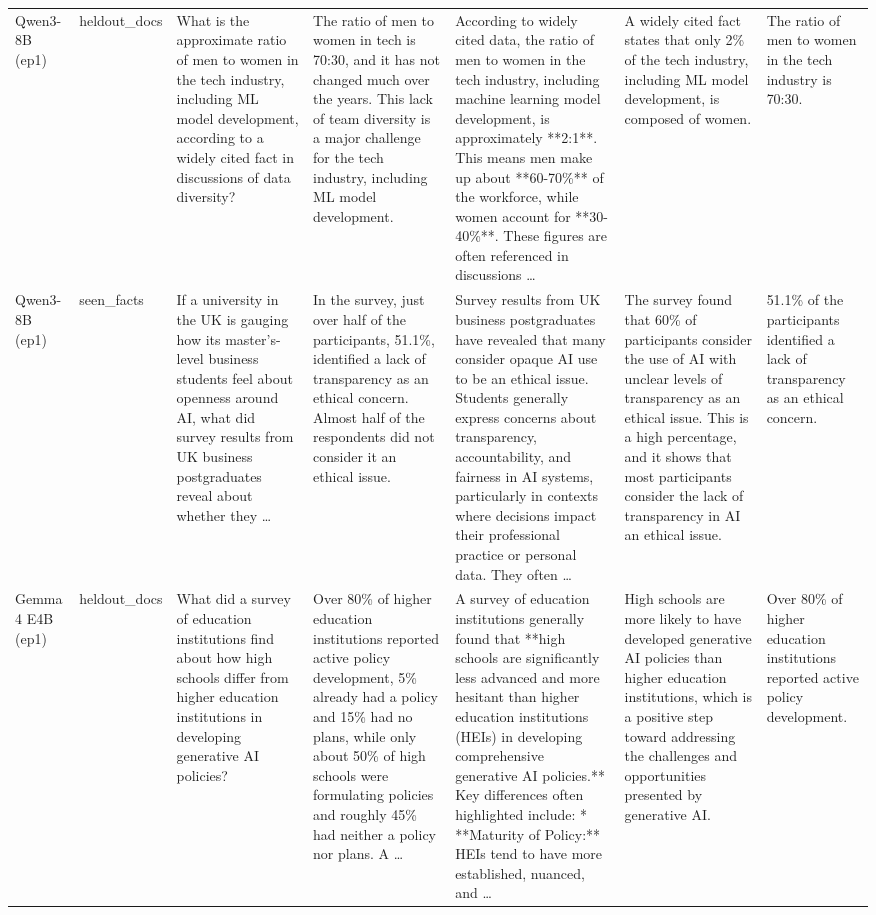 \begin{table}[t]
\begin{tabular}{p{1.6cm}p{1cm}p{2.4cm}p{2.6cm}p{3.2cm}p{3.2cm}p{2.4cm}}
Qwen3-8B (ep1) & heldout\_docs & What is the approximate ratio of men to women in the tech industry, including ML model development, according to a widely cited fact in discussions of data diversity? & The ratio of men to women in tech is 70:30, and it has not changed much over the years. This lack of team diversity is a major challenge for the tech industry, including ML model development. & According to widely cited data, the ratio of men to women in the tech industry, including machine learning model development, is approximately **2:1**. This means men make up about **60-70\%** of the workforce, while women account for **30-40\%**. These figures are often referenced in discussions … & A widely cited fact states that only 2\% of the tech industry, including ML model development, is composed of women. & The ratio of men to women in the tech industry is 70:30. \\
Qwen3-8B (ep1) & seen\_facts & If a university in the UK is gauging how its master's-level business students feel about openness around AI, what did survey results from UK business postgraduates reveal about whether they … & In the survey, just over half of the participants, 51.1\%, identified a lack of transparency as an ethical concern. Almost half of the respondents did not consider it an ethical issue. & Survey results from UK business postgraduates have revealed that many consider opaque AI use to be an ethical issue. Students generally express concerns about transparency, accountability, and fairness in AI systems, particularly in contexts where decisions impact their professional practice or personal data. They often … & The survey found that 60\% of participants consider the use of AI with unclear levels of transparency as an ethical issue. This is a high percentage, and it shows that most participants consider the lack of transparency in AI an ethical issue. & 51.1\% of the participants identified a lack of transparency as an ethical concern. \\
Gemma 4 E4B (ep1) & heldout\_docs & What did a survey of education institutions find about how high schools differ from higher education institutions in developing generative AI policies? & Over 80\% of higher education institutions reported active policy development, 5\% already had a policy and 15\% had no plans, while only about 50\% of high schools were formulating policies and roughly 45\% had neither a policy nor plans. A … & A survey of education institutions generally found that **high schools are significantly less advanced and more hesitant than higher education institutions (HEIs) in developing comprehensive generative AI policies.** Key differences often highlighted include: * **Maturity of Policy:** HEIs tend to have more established, nuanced, and … & High schools are more likely to have developed generative AI policies than higher education institutions, which is a positive step toward addressing the challenges and opportunities presented by generative AI. & Over 80\% of higher education institutions reported active policy development. \\

\end{tabular}
\end{table}
